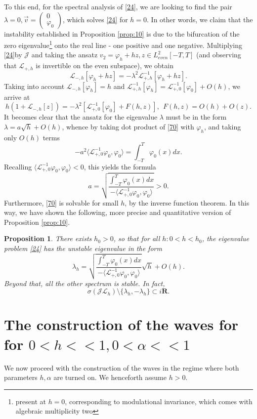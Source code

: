 \documentclass[12pt]{amsart}
\newtheorem{proposition}{Proposition}
\theoremstyle{definition}
\theoremstyle{remark}
\numberwithin{equation}{section}
\renewcommand{\(}{\left(}
\renewcommand{\)}{\right)}
\renewcommand{\[}{\left[}
\renewcommand{\]}{\right]}
\newcommand{\f}[2]{\frac{#1}{#2}}
\newcommand{\cl}{{\mathcal L}}
\newcommand{\al}{\alpha}
\newcommand{\la}{\lambda}
\newcommand{\si}{\sigma}
\newcommand{\vp}{\varphi}
\newcommand{\dpr}[2]{\langle #1,#2 \rangle}
\newcommand{\cj}{{\mathcal J}}
\begin{document}
 To this end,  for the spectral analysis of \eqref{24}, we are  looking to find the pair $\la=0, \vec{v}=\left(\begin{array}{ll} 0\\ \vp_0 \end{array} \right)$, which solves \eqref{24} for $h=0$.  In other words, we claim that the instability established in Proposition \ref{prop:10} is due to the bifurcation of the zero eigenvalue\footnote{present at $h=0$, corresponding to modulational invariance, which comes with algebraic multiplicity two} onto the real line - one positive and one negative.
 Multiplying  \eqref{24}by $\cj$ and taking the ansatz $v_2=\vp_h+h z, z\in L^2_{even}[-T,T]$ (and observing that   $\cl_{+,h}$ is invertible on the even subspace), we obtain
 \begin{equation}
\label{60}
\cl_{-,h}[\vp_h+ h z]=-\la^2 \cl_{+,h}^{-1}[\vp_h+h z].
 \end{equation}
 Taking into account $\cl_{-,h}[\vp_h]=h$ and $\cl_{+,h}^{-1}[\vp_h]=\cl_{+,0}^{-1}[\vp_0]+O(h)$,
  we arrive at
  \begin{equation}
  \label{70}
  h(1+\cl_{-,h}[z])=-\la^2[\cl_{+,0}^{-1}[\vp_0]+F(h,z)], \ \ F(h,z)=O(h)+O(z).
  \end{equation}
 It becomes clear that the ansatz for the eigenvalue $\la$ must be in the form $\la=a\sqrt{h}+O(h)$, whence by taking dot product of \eqref{70} with $\vp_h$, and taking only $O(h)$ terms
 $$
 -a^2 \dpr{\cl_{+,0}^{-1} \vp_0} {\vp_0}=\int_{-T}^T  \vp_0(x) dx.
 $$
 Recalling $\dpr{\cl_{+,0}^{-1} \vp_0} {\vp_0}<0$, this yields the formula
 $$
 a=\sqrt{\f{\int_{-T}^T  \vp_0(x) dx}{-\dpr{\cl_{+,0}^{-1} \vp_0} {\vp_0}}}>0.
 $$
 Furthermore, \eqref{70} is solvable for small $h$, by the inverse function theorem. In this way, we have shown the following, more precise and quantitative version of Proposition \ref{prop:10}.
 \begin{proposition}
 \label{prop:11}
 There exists $h_0>0$, so that for all $h: 0<h<h_0$, the eigenvalue problem \eqref{24} has the unstable eigenvalue in the form
 $$
 \la_h=\sqrt{\f{\int_{-T}^T  \vp_0(x) dx}{-\dpr{\cl_{+,0}^{-1} \vp_0} {\vp_0}}} \sqrt{h}+O(h).
 $$
 Beyond that, all the other spectrum is stable. In fact,
 $$
 \si(\cj\cl_{h})\setminus \{\la_h, -\la_h\}\subset i {\mathbf R}.
 $$
 \end{proposition}



 \section{The construction of the waves for for $0<h<<1, 0<\al<<1$}
 We now proceed with the construction of the waves in the regime where both parameters $h, \al$  are turned on.  We henceforth assume $h>0$.
\end{document}
